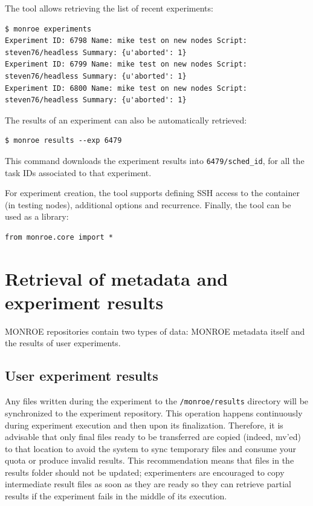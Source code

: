 \documentclass[a4paper,10pt]{article}
\newcommand{\VerbatimFont}{\footnotesize}
\newcommand{\monroe}{MONROE}
\newcommand{\identifier}[1]{{\texttt{\small{#1}}}}
\begin{document}
\noindent The tool allows retrieving the list of recent experiments:
{\VerbatimFont\begin{verbatim}
$ monroe experiments
Experiment ID: 6798 Name: mike test on new nodes Script: steven76/headless Summary: {u'aborted': 1}
Experiment ID: 6799 Name: mike test on new nodes Script: steven76/headless Summary: {u'aborted': 1}
Experiment ID: 6800 Name: mike test on new nodes Script: steven76/headless Summary: {u'aborted': 1}
\end{verbatim}}

\noindent The results of an experiment can also be automatically retrieved:
{\VerbatimFont\begin{verbatim}
$ monroe results --exp 6479
\end{verbatim}}
\noindent This command downloads the experiment results into \identifier{6479/sched\_id}, for all the task IDs associated to that experiment.

For experiment creation, the tool supports defining SSH access to the container (in testing nodes), additional options and recurrence.
Finally, the tool can be used as a library:
{\VerbatimFont\begin{verbatim}
from monroe.core import *
\end{verbatim}}



\section{Retrieval of metadata and experiment results}
\label{sec:resultRetrieval}

\monroe{} repositories contain two types of data: \monroe{} metadata itself and the results of user experiments.

\subsection{User experiment results}

Any files written during the experiment to the \identifier{/monroe/results} directory will be synchronized to the experiment repository.
This operation happens continuously during experiment execution and then upon its finalization.
Therefore, it is advisable that only final files ready to be transferred are copied (indeed, mv'ed) to that location to avoid the system to sync temporary files and consume your quota or produce invalid results.
This recommendation means that files in the results folder should not be updated; experimenters are encouraged to copy intermediate result files as soon as they are ready so they can retrieve partial results if the experiment fails in the middle of its execution.
\end{document}
